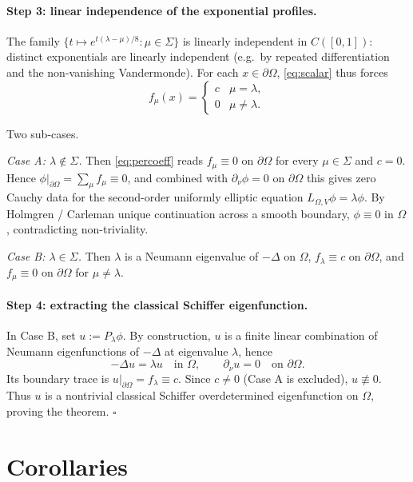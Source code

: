 \documentclass[11pt]{article}
\newcommand{\Om}{\Omega}
\newcommand{\1}{\mathbf 1}
\newcommand{\nor}{\partial_\nu}
\begin{document}
\paragraph{Step 3: linear independence of the exponential profiles.}
The family $\{t\mapsto e^{t(\lambda-\mu)/8}:\mu\in\Sigma\}$ is
linearly independent in $C([0,1])$: distinct exponentials are
linearly independent (e.g.\ by repeated differentiation and the
non-vanishing Vandermonde). For each $x\in\partial\Om$,
\eqref{eq:scalar} thus forces
\begin{equation}\label{eq:percoeff}
    f_\mu(x)=\begin{cases} c & \mu=\lambda,\\
        0 & \mu\ne\lambda.\end{cases}
\end{equation}

Two sub-cases.

\emph{Case A: $\lambda\notin\Sigma$.} Then \eqref{eq:percoeff} reads
$f_\mu\equiv 0$ on $\partial\Om$ for every $\mu\in\Sigma$ and $c=0$.
Hence $\phi|_{\partial\Om}=\sum_\mu f_\mu\equiv 0$, and combined with
$\nor\phi=0$ on $\partial\Om$ this gives zero Cauchy data for the
second-order uniformly elliptic equation $L_{\Om,V}\phi=\lambda\phi$.
By Holmgren / Carleman unique continuation across a smooth boundary,
$\phi\equiv 0$ in $\Om$, contradicting non-triviality.

\emph{Case B: $\lambda\in\Sigma$.} Then $\lambda$ is a Neumann
eigenvalue of $-\Delta$ on $\Om$, $f_\lambda\equiv c$ on
$\partial\Om$, and $f_\mu\equiv 0$ on $\partial\Om$ for $\mu\ne\lambda$.

\paragraph{Step 4: extracting the classical Schiffer eigenfunction.}
In Case B, set $u:=P_\lambda\phi$. By construction, $u$ is a finite
linear combination of Neumann eigenfunctions of $-\Delta$ at
eigenvalue $\lambda$, hence
\[
    -\Delta u=\lambda u\quad\text{in }\Om,\qquad
    \nor u=0\quad\text{on }\partial\Om.
\]
Its boundary trace is $u|_{\partial\Om}=f_\lambda\equiv c$. Since
$c\ne 0$ (Case A is excluded), $u\not\equiv 0$. Thus $u$ is a
nontrivial classical Schiffer overdetermined eigenfunction on $\Om$,
proving the theorem.
\hfill$\square$

\section{Corollaries}
\end{document}
